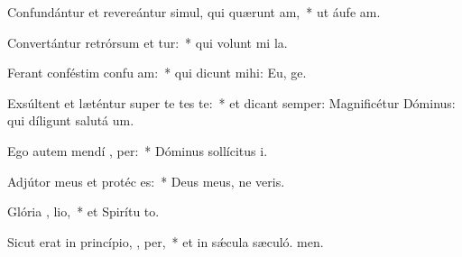 \item Confundántur et revereántur simul, qui quærunt  am,~* ut áufe am.
\item Convertántur retrórsum et tur:~* qui volunt mi la.
\item Ferant conféstim confu am:~* qui dicunt mihi: Eu, ge.
\item Exsúltent et læténtur super te  tes te:~* et dicant semper: Magnificétur Dóminus: qui díligunt salutá um.
\item Ego autem mendí ,  per:~* Dóminus sollícitus  i.
\item Adjútor meus et protéc   es:~* Deus meus, ne veris.
\item Glória ,  lio,~* et Spirítu to.
\item Sicut erat in princípio,  ,  per,~* et in sǽcula sæculó. men.

